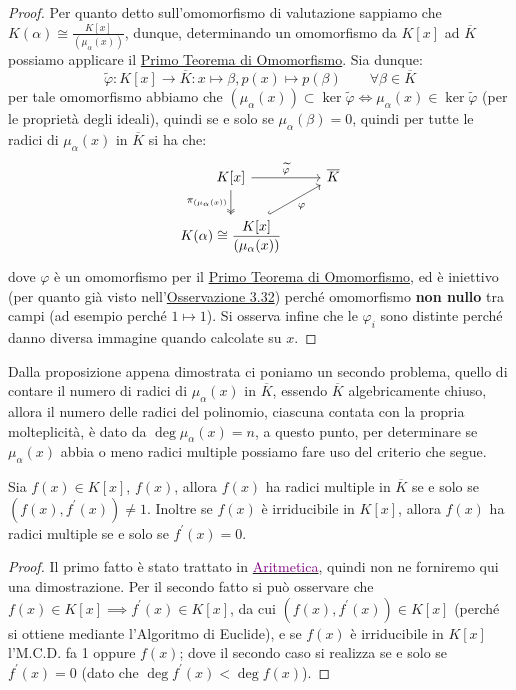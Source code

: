 \documentclass[11pt]{scrartcl}
\begin{document}
\begin{proof}
    Per quanto detto sull'omomorfismo di valutazione sappiamo che $\displaystyle K(\alpha) \cong \frac{K[x]}{(\mu_\alpha(x))}$, dunque, determinando un omomorfismo da $K[x]$ ad $\overline K$ possiamo applicare il 
    \hyperref[omo]{Primo Teorema di Omomorfismo}. Sia dunque:
    \[ \widetilde{\varphi} : K[x] \longrightarrow \overline K : x \longmapsto \beta , p(x) \longmapsto p(\beta) \qquad \forall \beta \in \overline K
        \]
    per tale omomorfismo abbiamo che $(\mu_\alpha(x)) \subset \ker \widetilde{\varphi} \iff \mu_\alpha(x) \in \ker \widetilde{\varphi}$ (per le proprietà degli ideali), quindi se e solo se $\mu_\alpha(\beta) = 0$,
    quindi per tutte le radici di $\mu_\alpha(x)$ in $\overline K$ si ha che:
    \[\begin{tikzcd}
		K[x] \arrow[d, "\pi_{(\mu_\alpha(x))}" left, twoheadrightarrow] \arrow[r, "\widetilde{\varphi}"] & \overline K \\	
		\displaystyle K(\alpha) \cong \frac{K[x]}{(\mu_\alpha(x))} \arrow[ur, "\varphi"', hookrightarrow] & 
	\end{tikzcd}
        \]
    dove $\varphi$ è un omomorfismo per il \hyperref[omo]{Primo Teorema di Omomorfismo}, ed è iniettivo (per quanto già visto nell'\hyperref[3.32]{Osservazione 3.32}) perché omomorfismo \textbf{non nullo} tra campi (ad esempio perché $1 \longmapsto 1$). Si osserva infine che 
    le $\varphi_i$ sono distinte perché danno diversa immagine quando calcolate su $x$.
\end{proof}

Dalla proposizione appena dimostrata ci poniamo un secondo problema, quello di contare il numero di radici di $\mu_\alpha (x)$ in $\overline K$, essendo $\overline K$ algebricamente chiuso, allora il numero delle radici del polinomio, ciascuna contata 
con la propria molteplicità, è dato da $\deg \mu_\alpha(x) = n$, a questo punto, per determinare se $\mu_\alpha(x)$ abbia o meno radici multiple possiamo fare uso del criterio che segue.

\begin{theorem}
	\label{derivata}
	Sia $f(x) \in K[x]$, $f(x)$, allora $f(x)$ ha radici multiple in $\overline K$ se e solo se $(f(x),f^{\prime}(x)) \ne 1$. Inoltre se $f(x)$ è irriducibile in $K[x]$, allora $f(x)$ ha radici multiple se e solo se $f^{\prime}(x) = 0$.
\end{theorem}

\begin{proof}
    Il primo fatto è stato trattato in \href{https://github.com/diego-unipi/Appunti-Aritmetica}{\textcolor{purple}{Aritmetica}}, quindi non ne forniremo qui una dimostrazione. Per il secondo fatto si può osservare che $f(x) \in K[x] \implies f^{\prime}(x) \in K[x]$,
    da cui $(f(x),f^{\prime}(x)) \in K[x]$ (perché si ottiene mediante l'Algoritmo di Euclide), e se $f(x)$ è irriducibile in $K[x]$ l'M.C.D. fa 1 oppure $f(x)$; dove il secondo caso si realizza se e solo se $f^{\prime}(x) = 0$ (dato che $\deg f^{\prime}(x) < \deg f(x)$).
\end{proof}
\end{document}
